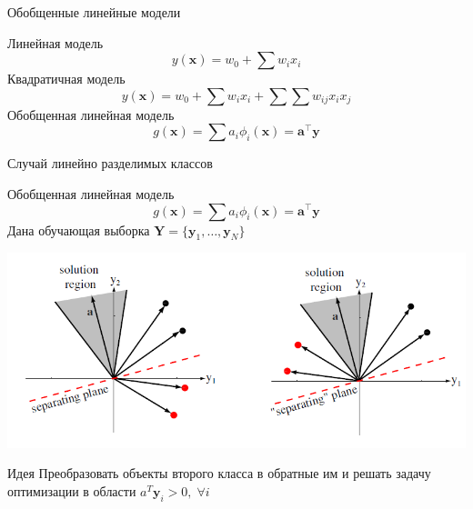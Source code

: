 \documentclass[10pt,a4paper]{beamer}
\begin{document}

\begin{frame}{Обобщенные линейные модели}

Линейная модель
\[
y(\mathbf{x}) = w_0 + \sum w_i x_i
\]
Квадратичная модель
\[
y(\mathbf{x}) = w_0 + \sum w_i x_i + \sum \sum w_{ij} x_i x_j
\]
Обобщенная линейная модель
\[
g(\mathbf{x}) = \sum a_i \phi_i(\mathbf{x}) = \mathbf{a}^\top \mathbf{y}
\]

\end{frame}


\begin{frame}{Случай линейно разделимых классов}

Обобщенная линейная модель
\[
g(\mathbf{x}) = \sum a_i \phi_i(\mathbf{x}) = \mathbf{a}^\top \mathbf{y}
\]
Дана обучающая выборка $\mathbf{Y} = \{\mathbf{y}_1, \ldots, \mathbf{y}_N\}$

\begin{center}
\includegraphics[scale=0.35]{images/optimzation.png}
\end{center}

\begin{exampleblock}{Идея}
Преобразовать объекты второго класса в обратные им и решать задачу оптимизации в области $a^T \mathbf{y}_i > 0, \; \forall i$
\end{exampleblock}

\end{frame}

\end{document}
